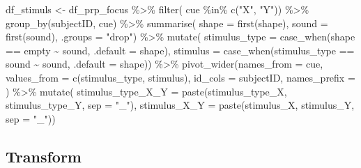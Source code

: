 \documentclass[
  letterpaper,
  DIV=11,
  numbers=noendperiod]{scrartcl}
\newenvironment{Shaded}{\begin{snugshade}}{\end{snugshade}}
\newcommand{\AttributeTok}[1]{\textcolor[rgb]{0.40,0.45,0.13}{#1}}
\newcommand{\FunctionTok}[1]{\textcolor[rgb]{0.28,0.35,0.67}{#1}}
\newcommand{\NormalTok}[1]{\textcolor[rgb]{0.00,0.23,0.31}{#1}}
\newcommand{\OtherTok}[1]{\textcolor[rgb]{0.00,0.23,0.31}{#1}}
\newcommand{\SpecialCharTok}[1]{\textcolor[rgb]{0.37,0.37,0.37}{#1}}
\newcommand{\StringTok}[1]{\textcolor[rgb]{0.13,0.47,0.30}{#1}}
\begin{document}
\begin{Shaded}
\begin{Highlighting}[]
\NormalTok{df\_stimuls }\OtherTok{\textless{}{-}}\NormalTok{ df\_prp\_focus }\SpecialCharTok{\%\textgreater{}\%}
  \FunctionTok{filter}\NormalTok{( cue }\SpecialCharTok{\%in\%} \FunctionTok{c}\NormalTok{(}\StringTok{"X"}\NormalTok{, }\StringTok{"Y"}\NormalTok{)) }\SpecialCharTok{\%\textgreater{}\%}
  \FunctionTok{group\_by}\NormalTok{(subjectID, cue) }\SpecialCharTok{\%\textgreater{}\%}
  \FunctionTok{summarise}\NormalTok{( }\AttributeTok{shape =} \FunctionTok{first}\NormalTok{(shape), }\AttributeTok{sound =} \FunctionTok{first}\NormalTok{(sound), }\AttributeTok{.groups =} \StringTok{"drop"}\NormalTok{) }\SpecialCharTok{\%\textgreater{}\%}
  \FunctionTok{mutate}\NormalTok{( }\AttributeTok{stimulus\_type =} \FunctionTok{case\_when}\NormalTok{(shape }\SpecialCharTok{==} \StringTok{\textquotesingle{}empty\textquotesingle{}} \SpecialCharTok{\textasciitilde{}} \StringTok{\textquotesingle{}sound\textquotesingle{}}\NormalTok{, }\AttributeTok{.default =} \StringTok{\textquotesingle{}shape\textquotesingle{}}\NormalTok{),}
          \AttributeTok{stimulus =} \FunctionTok{case\_when}\NormalTok{(stimulus\_type }\SpecialCharTok{==} \StringTok{\textquotesingle{}sound\textquotesingle{}} \SpecialCharTok{\textasciitilde{}}\NormalTok{ sound, }\AttributeTok{.default =}\NormalTok{ shape)) }\SpecialCharTok{\%\textgreater{}\%}
  \FunctionTok{pivot\_wider}\NormalTok{(}\AttributeTok{names\_from =}\NormalTok{ cue, }\AttributeTok{values\_from =} \FunctionTok{c}\NormalTok{(stimulus\_type, stimulus), }\AttributeTok{id\_cols =}\NormalTok{ subjectID, }\AttributeTok{names\_prefix =} \StringTok{\textquotesingle{}\textquotesingle{}}\NormalTok{) }\SpecialCharTok{\%\textgreater{}\%}
  \FunctionTok{mutate}\NormalTok{( }\AttributeTok{stimulus\_type\_X\_Y =} \FunctionTok{paste}\NormalTok{(stimulus\_type\_X, stimulus\_type\_Y, }\AttributeTok{sep =} \StringTok{"\_"}\NormalTok{),}
          \AttributeTok{stimulus\_X\_Y =} \FunctionTok{paste}\NormalTok{(stimulus\_X, stimulus\_Y, }\AttributeTok{sep =} \StringTok{"\_"}\NormalTok{))}
\end{Highlighting}
\end{Shaded}

\subsection{Transform}\label{transform}
\end{document}
